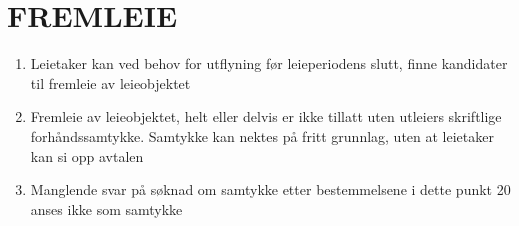 \section{FREMLEIE}


    \begin{enumerate}

        \item Leietaker kan ved behov for utflyning før leieperiodens slutt, finne kandidater til fremleie av leieobjektet

        \item Fremleie av leieobjektet, helt eller delvis er ikke tillatt uten utleiers skriftlige forhåndssamtykke.
        Samtykke kan nektes på fritt grunnlag, uten at leietaker kan si opp avtalen

        \item Manglende svar på søknad om samtykke etter bestemmelsene i dette punkt 20 anses ikke som
        samtykke


    \end{enumerate}
